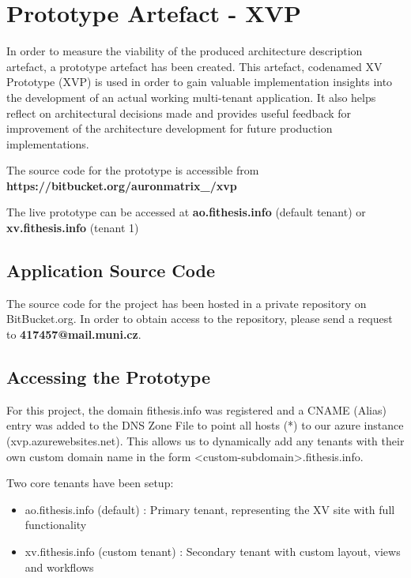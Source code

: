 \chapter{Prototype Artefact - XVP}

In order to measure the viability of the produced architecture description  artefact, a prototype artefact has been created. This artefact, codenamed XV Prototype (XVP) is used in order to gain valuable implementation insights into the development of an actual working multi-tenant  application. It also helps reflect on architectural decisions made and provides useful feedback for improvement of the architecture development for future production implementations.

\begin{tcolorbox}[colback=blue!3,colframe=blue!40!black,title=Prototype Source]
The source code for the prototype is accessible from \textbf{https://bitbucket.org/auronmatrix\_/xvp}
\end{tcolorbox}

\begin{tcolorbox}[colback=blue!3,colframe=blue!40!black,title=Online Prototype]
The live prototype can be accessed at \textbf{ao.fithesis.info} (default tenant) or \textbf{xv.fithesis.info} (tenant 1)
\end{tcolorbox}

\section{Application Source Code}
The source code for the project has been hosted in a private repository on BitBucket.org. In order to obtain access to the repository, please send a request to 
\textbf{417457@mail.muni.cz}.


\section{Accessing the Prototype}
For this project, the domain fithesis.info was registered and a CNAME (Alias) entry was added to the DNS Zone File to point all hosts (*) to our azure instance (xvp.azurewebsites.net). This allows us to dynamically add any tenants with their own custom domain name in the form
<custom-subdomain>.fithesis.info. 

Two core tenants have been setup:
\begin{itemize}
\item ao.fithesis.info (default) : Primary tenant, representing the XV site with full functionality
\item xv.fithesis.info (custom tenant) : Secondary tenant with custom layout, views and workflows
\end{itemize}

